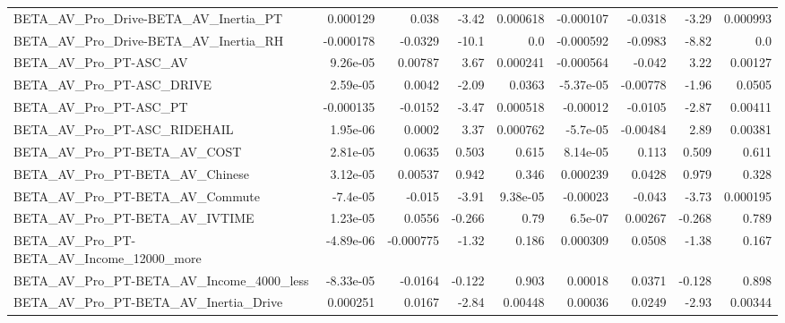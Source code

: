 \begin{tabular}{lrrrrrrrr}
BETA\_AV\_Pro\_Drive-BETA\_AV\_Inertia\_PT               &    0.000129 &        0.038 &    -3.42 & 0.000618 &  -0.000107 &     -0.0318 &        -3.29 &      0.000993 \\
BETA\_AV\_Pro\_Drive-BETA\_AV\_Inertia\_RH               &   -0.000178 &      -0.0329 &    -10.1 &      0.0 &  -0.000592 &     -0.0983 &        -8.82 &           0.0 \\
BETA\_AV\_Pro\_PT-ASC\_AV                              &    9.26e-05 &      0.00787 &     3.67 & 0.000241 &  -0.000564 &      -0.042 &         3.22 &       0.00127 \\
BETA\_AV\_Pro\_PT-ASC\_DRIVE                           &    2.59e-05 &       0.0042 &    -2.09 &   0.0363 &  -5.37e-05 &    -0.00778 &        -1.96 &        0.0505 \\
BETA\_AV\_Pro\_PT-ASC\_PT                              &   -0.000135 &      -0.0152 &    -3.47 & 0.000518 &   -0.00012 &     -0.0105 &        -2.87 &       0.00411 \\
BETA\_AV\_Pro\_PT-ASC\_RIDEHAIL                        &    1.95e-06 &       0.0002 &     3.37 & 0.000762 &   -5.7e-05 &    -0.00484 &         2.89 &       0.00381 \\
BETA\_AV\_Pro\_PT-BETA\_AV\_COST                        &    2.81e-05 &       0.0635 &    0.503 &    0.615 &   8.14e-05 &       0.113 &        0.509 &         0.611 \\
BETA\_AV\_Pro\_PT-BETA\_AV\_Chinese                     &    3.12e-05 &      0.00537 &    0.942 &    0.346 &   0.000239 &      0.0428 &        0.979 &         0.328 \\
BETA\_AV\_Pro\_PT-BETA\_AV\_Commute                     &    -7.4e-05 &       -0.015 &    -3.91 & 9.38e-05 &   -0.00023 &      -0.043 &        -3.73 &      0.000195 \\
BETA\_AV\_Pro\_PT-BETA\_AV\_IVTIME                      &    1.23e-05 &       0.0556 &   -0.266 &     0.79 &    6.5e-07 &     0.00267 &       -0.268 &         0.789 \\
BETA\_AV\_Pro\_PT-BETA\_AV\_Income\_12000\_more           &   -4.89e-06 &    -0.000775 &    -1.32 &    0.186 &   0.000309 &      0.0508 &        -1.38 &         0.167 \\
BETA\_AV\_Pro\_PT-BETA\_AV\_Income\_4000\_less            &   -8.33e-05 &      -0.0164 &   -0.122 &    0.903 &    0.00018 &      0.0371 &       -0.128 &         0.898 \\
BETA\_AV\_Pro\_PT-BETA\_AV\_Inertia\_Drive               &    0.000251 &       0.0167 &    -2.84 &  0.00448 &    0.00036 &      0.0249 &        -2.93 &       0.00344 \\

\end{tabular}
